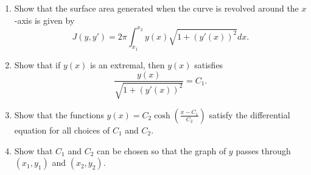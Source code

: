\documentclass{article}
\begin{document}
\begin{enumerate}
            \begin{enumerate}
                  \item Show that the surface area generated when the curve is
                        revolved around the $x$-axis is given by
                        \begin{equation}
                              J(y, y') = 2\pi\int_{x_1}^{x_2}y(x)
                              \sqrt{1+(y'(x))^2}dx.
                        \end{equation}
                  \item Show that if $y(x)$ is an extremal, then $y(x)$
                        satisfies
                        \[
                              \frac{y(x)}{\sqrt{1+(y'(x))^2}}=C_1.
                        \]
                  \item Show that the functions $y(x)=C_2\cosh
                              (\frac{x-C_1}{C_2})$ satisfy the differential
                        equation for all choices of $C_1$ and $C_2$.
                  \item Show that $C_1$ and $C_2$ can be chosen so that the
                        graph of $y$ passes through $(x_1, y_1)$ and
                        $(x_2, y_2)$.
            \end{enumerate}
\end{enumerate}
\end{document}
